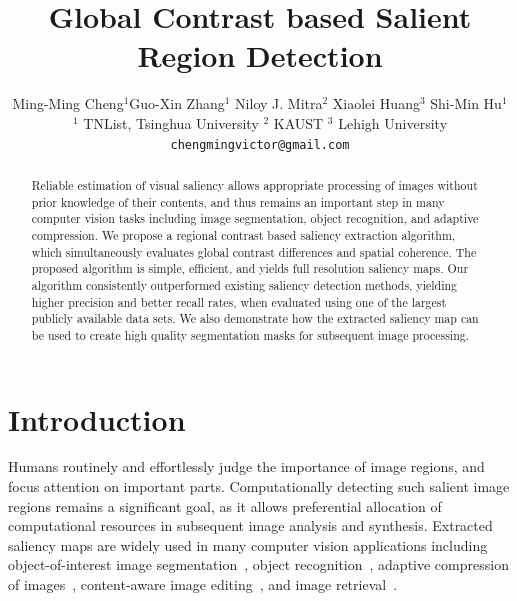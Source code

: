 \documentclass[final]{cvpr}
\begin{document}

\title{Global Contrast based Salient Region Detection}

\author{Ming-Ming Cheng$^{1}$\quad Guo-Xin Zhang$^{1}$ \quad Niloy J. Mitra$^{2}$
    \quad Xiaolei Huang$^{3}$  \quad Shi-Min Hu$^{1}$  \\
    $^{1}$ TNList, Tsinghua University \quad \quad
    $^2$ KAUST   \quad \quad $^3$ Lehigh University\\
    {\tt \small chengmingvictor@gmail.com}
}

\maketitle
\thispagestyle{empty}
\pagestyle{empty}
\begin{abstract}
%
Reliable estimation of visual saliency allows appropriate processing of images without prior
knowledge of their contents, and thus remains an important step in many computer vision tasks
including image segmentation, object recognition, and adaptive compression.
%
We propose a regional contrast based saliency extraction algorithm,
which simultaneously evaluates global contrast differences and spatial coherence.
%
The proposed algorithm is simple, efficient, and yields full resolution saliency maps.
%
Our algorithm consistently outperformed existing saliency detection methods, yielding
higher precision and better recall rates, when evaluated using one of the largest
publicly available data sets.
%
We also demonstrate how the extracted saliency map can be used to create high quality
segmentation masks for subsequent image processing.


\end{abstract}




\section{Introduction}\label{sec:Introduction}

Humans routinely and effortlessly judge the importance of image regions, and focus
attention on important parts.
%
Computationally detecting such salient image regions remains a significant goal,
as it allows preferential allocation of computational resources in subsequent image analysis and synthesis.
%
Extracted saliency maps are widely used in many computer vision applications including object-of-interest
image segmentation~\cite{06TCSVT/han_unsupervised,06josa/KoN_InterestSegmentation},
object recognition~\cite{04cvpr/RutishauserWWKP},  adaptive compression of images~\cite{00CE/christopoulos_jpeg},
content-aware image editing~\cite{TOG/Wang08,09cgf/ZhangC,wu-2010-resizing,10vc/Ding}, and image retrieval~\cite{tog09/ChenCT_Sketch2Photo}.
\end{document}
